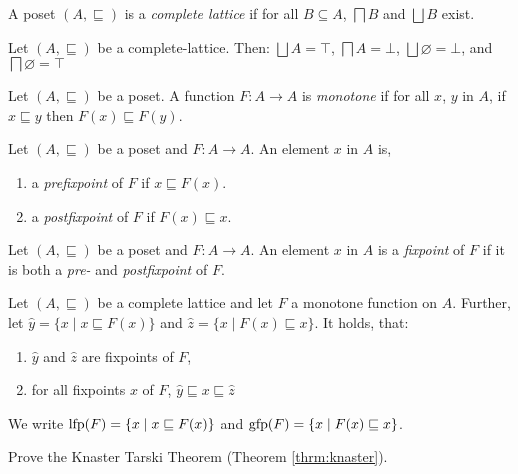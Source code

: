 \begin{definition}
    A poset $(A,\sqsubseteq)$ is a \emph{complete lattice} if for all $B \subseteq A$, $\bigsqcap B$ and $\bigsqcup B$ exist.
\end{definition}

\begin{example}
    Let $(A,\sqsubseteq)$ be a complete-lattice. Then: $\bigsqcup A = \top$, $\bigsqcap A = \bot$, $\bigsqcup \varnothing = \bot$, and $\bigsqcap \varnothing = \top$
\end{example}

\begin{definition}
Let $(A, \sqsubseteq)$ be a poset. A function $F: A \to A$ is \emph{monotone} if for all $x$, $y$ in $A$, if $x \sqsubseteq y$ then $F(x) \sqsubseteq F(y)$.
\end{definition}

\begin{definition}
Let $(A, \sqsubseteq)$ be a poset and $F: A \to A$. An element $x$ in $A$ is,
\begin{enumerate}
  \item a \emph{prefixpoint} of $F$ if $x \sqsubseteq F(x)$.
  \item a \emph{postfixpoint} of $F$ if $F(x) \sqsubseteq x$.
\end{enumerate}
\end{definition}

\begin{definition}[Fixpoint]
Let $(A, \sqsubseteq)$ be a poset and $F: A \to A$. An element $x$ in $A$ is a \emph{fixpoint} of $F$ if it is both a \emph{pre-} and \emph{postfixpoint} of $F$.
\end{definition}

\begin{theorem}
\label{thrm:knaster}
    Let $(A,\sqsubseteq)$ be a complete lattice and let $F$ a monotone function on $A$.
    Further, let $\hat{y} = \{x \mid x \sqsubseteq F(x)\}$ and $\hat{z} = \{x \mid F(x) \sqsubseteq x\}$.
    It holds, that:
    \begin{enumerate}
      \item $\hat{y}$ and $\hat{z}$ are fixpoints of $F$,
      \item for all fixpoints $x$ of $F$, $\hat{y} \sqsubseteq x \sqsubseteq \hat{z}$
    \end{enumerate}
\end{theorem}
We write $\mathrm{lfp}(F) = \{x \mid x \sqsubseteq F(x)\}$ and $\mathrm{gfp}(F) = \{x \mid F(x)\sqsubseteq x\}$.

\begin{exercise}
        Prove the Knaster Tarski Theorem (Theorem \ref{thrm:knaster}).
\end{exercise}


